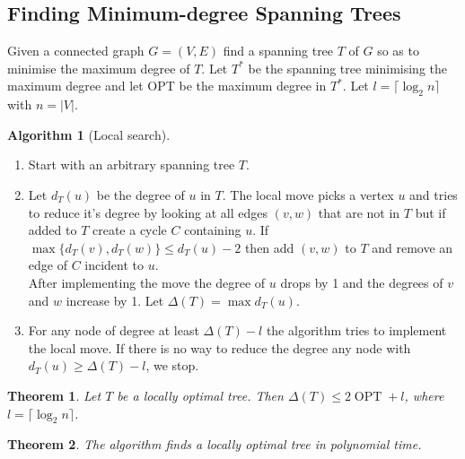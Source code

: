 \documentclass{article}
\newtheorem*{thm}{Theorem}
\theoremstyle{definition}
\newtheorem*{alg}{Algorithm}
\DeclareMathOperator{\OPT}{OPT}
\begin{document}
\subsection{Finding Minimum-degree Spanning Trees}
Given a connected graph $G=(V,E)$ find a spanning tree $T$ of $G$ so as to minimise the maximum degree of $T$.
Let $T^*$ be the spanning tree minimising the maximum degree and let OPT be the maximum degree in $T^*$.
Let $l =\lceil \log_2n\rceil$ with $n = |V|$.

\begin{alg}[Local search]~
\begin{enumerate}
\item Start with an arbitrary spanning tree $T$.
\item Let $d_T(u)$ be the degree of $u$ in $T$.
The local move picks a vertex $u$ and tries to reduce it's degree by looking at all edges $(v,w)$ that are not in $T$ but if added to $T$ create a cycle $C$ containing $u$.
If $\max\{d_T(v),d_T(w)\} \le d_T(u)-2$ then add $(v,w)$ to $T$ and remove an edge of $C$ incident to $u$. \\
After implementing the move the degree of $u$ drops by 1 and the degrees of $v$ and $w$ increase by 1.
Let $\Delta(T) = \max d_T(u)$.
\item For any node of degree at least $\Delta(T) - l $ the algorithm tries to implement the local move.
If there is no way to reduce the degree any node with $d_T(u)\ge \Delta(T) - l$, we stop.
\end{enumerate}
\end{alg}

\begin{thm}
Let $T$ be a locally optimal tree.
Then $\Delta(T)\le 2\OPT + l$, where $l=\lceil \log_2n \rceil$.
\end{thm}

\begin{thm}
The algorithm finds a locally optimal tree in polynomial time.
\end{thm}
\end{document}
